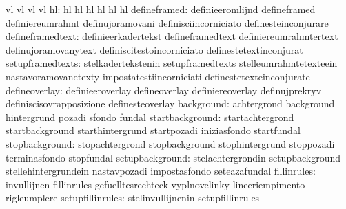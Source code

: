                                   vl                               vl
                                  vl                               vl
                              hl: hl                               hl
                                  hl                               hl
                                  hl                               hl
                    defineframed: definieeromlijnd                 defineframed
                                  definiereumrahmt                 definujoramovani
                                  definisciincorniciato            definesteinconjurare
                defineframedtext: definieerkadertekst              defineframedtext
                                  definiereumrahmtertext           definujoramovanytext
                                  definiscitestoincorniciato       definestetextinconjurat
                setupframedtexts: stelkadertekstenin               setupframedtexts
                                  stelleumrahmtetexteein           nastavoramovanetexty
                                  impostatestiincorniciati         definestetexteinconjurate
                   defineoverlay: definieeroverlay                 defineoverlay
                                  definiereoverlay                 definujprekryv
                                  definiscisovrapposizione         definesteoverlay
                      background: achtergrond                      background
                                  hintergrund                      pozadi
                                  sfondo                           fundal
                 startbackground: startachtergrond                 startbackground
                                  starthintergrund                 startpozadi
                                  iniziasfondo                     startfundal
                  stopbackground: stopachtergrond                  stopbackground
                                  stophintergrund                  stoppozadi
                                  terminasfondo                    stopfundal
                 setupbackground: stelachtergrondin                setupbackground
                                  stellehintergrundein             nastavpozadi
                                  impostasfondo                    seteazafundal
                     fillinrules: invullijnen                      fillinrules
                                  gefuelltesrechteck               vyplnovelinky %
                                  lineeriempimento                 rigleumplere
                setupfillinrules: stelinvullijnenin                setupfillinrules
